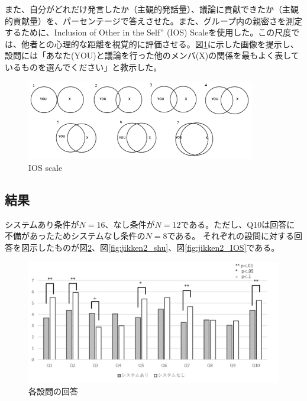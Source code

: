\documentclass[11pt, a4paper]{jreport} %
\begin{document}
また、自分がどれだけ発言したか（主観的発話量）、議論に貢献できたか（主観的貢献量）を、パーセンテージで答えさせた。また、グループ内の親密さを測定するために、Inclusion of Other in the Self” (IOS) Scale\cite{IOS}を使用した。この尺度では、他者との心理的な距離を視覚的に評価させる。図\ref{fig:IOS}に示した画像を提示し、設問には「あなた(YOU)と議論を行った他のメンバ(X)の関係を最もよく表しているものを選んでください」と教示した。

\begin{figure}[htbp]
\begin{center}
\includegraphics[width=100mm]{images/IOS}
\caption{IOS scale}
\label{fig:IOS}
\end{center}
\end{figure}

\subsection{結果}
システムあり条件が$N=16$、なし条件が$N=12$である。ただし、Q10は回答に不備があったためシステムなし条件の$N=8$である。
それぞれの設問に対する回答を図示したものが図\ref{fig:jikken2_kobetu}、図\ref{fig:jikken2_shu}、図\ref{fig:jikken2_IOS}である。

\begin{figure}[htbp]
\begin{center}
\includegraphics[width=150mm]{images/jikken2_kobetu}
\caption{各設問の回答}
\label{fig:jikken2_kobetu}
\end{center}
\end{figure}
\end{document}

